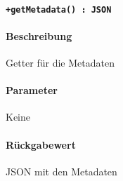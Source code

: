 \paragraph{\texttt{+getMetadata() : JSON}}%
\paragraph*{Beschreibung}
Getter für die Metadaten
\paragraph*{Parameter}
Keine
\paragraph*{Rückgabewert}
JSON mit den Metadaten